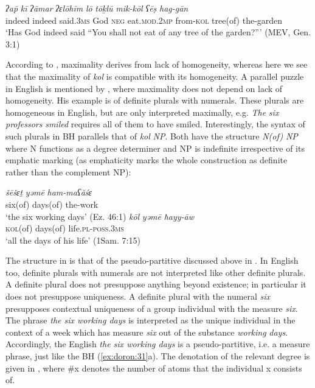 \documentclass[output=paper]{langsci/langscibook}
\begin{document}
\ea%
    \label{ex:doron:30}
    \gll \textit{ʔa\={p}} \textit{kī} \textit{ʔāmar} \textit{ʔɛlōhīm}  \textit{lō} \textit{tōḵlū} \textit{mik-kōl} \textit{ʕēṣ} \textit{hag-gān}\\
         indeed  indeed  said.\textsc{3ms}  God       \textsc{neg} eat\textsc{.mod.2mp} from-\textsc{kol} tree(of) the-garden  \\
    \glt `Has God indeed said ``You shall not eat of any tree of the garden?''{'} (MEV, Gen. 3:1)
    \z

According to \citet{Križ2016}, maximality derives from lack of homogeneity, where\-as here we see that the maximality of \textit{kol} is compatible with its homogeneity. A parallel puzzle in English is mentioned by \citet[515]{Križ2016}, where maximality does not depend on lack of homogeneity. His example is of definite plurals with numerals. These plurals are homogeneous in English, but are only interpreted maximally, e.g. \textit{The} \textit{six} \textit{professors} \textit{smiled} requires all of them to have smiled. Interestingly, the syntax of such plurals in BH parallels that of \textit{kol} \textit{NP}. Both have the structure \textit{N(of)} \textit{NP} where N functions as a degree determiner and NP is indefinite irrespective of its emphatic marking (as emphaticity marks the whole construction as definite rather than the complement NP):

\ea%
    \label{ex:doron:31}
    \ea
    \gll \textit{šēšɛṯ}      \textit{yəmē}      \textit{ham-maʕăśɛ}       \\
         six(of)  days(of)  the-work              \\
    \glt `the six working days' (Ez. 46:1)
    \ex
    \gll \textit{kōl}          \textit{yəmē}        \textit{ħayy-āw} \\
         \textsc{kol(}of)  days(of)   life.\textsc{pl-poss.3ms}\\
    \glt `all the days of his life' (1Sam. 7:15)
    \z
\z

The structure in  is that of the pseudo-partitive discussed above in . In English too, definite plurals with numerals are not interpreted like other definite plurals. A definite plural does not presuppose anything beyond existence; in particular it does not presuppose uniqueness. A definite plural with the numeral \textit{six} presupposes contextual uniqueness of a group individual with the measure \textit{six}. The phrase \textit{the six working days} is interpreted as the unique individual in the context of a week which has measure \textit{six} out of the substance \textit{working} \textit{days}. Accordingly, the English \textit{the six working days} is a pseudo-partitive, i.e. a measure phrase, just like the BH (\ref{ex:doron:31}a). The denotation of the relevant degree is given in , where \#x denotes the number of atoms that the individual x consists of.
\end{document}
